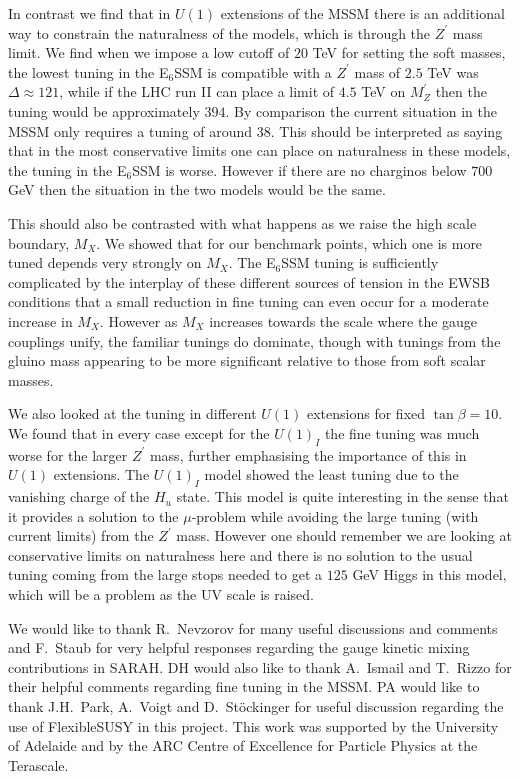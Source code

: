 \documentclass[preprint,amsmath,amssymb,aps,superscriptaddress,prd,
showpacs,floatfix,nofootinbib]{revtex4-1}
\begin{document}
In contrast we find that in $U(1)$ extensions of the MSSM there is an
additional way to constrain the naturalness of the models, which is
through the $Z^\prime$ mass limit.  We find when we impose a low
cutoff of $20$ TeV for setting the soft masses, the lowest tuning in
the E$_6$SSM is compatible with a $Z^\prime$ mass of $2.5$ TeV was
$\Delta \approx 121$, while if the LHC run II can place a limit of
$4.5$ TeV on $M_Z^\prime$ then the tuning would be approximately $394$.
By comparison the current situation in the MSSM only requires a tuning
of around $38$.  This should be interpreted as saying that in
the most conservative limits one can place on naturalness in these
models, the tuning in the E$_6$SSM is worse.  However if there are no
charginos below $700$ GeV then the situation in the two models would
be the same.

This should also be contrasted with what happens as we raise the high
scale boundary, $M_X$.  We showed that for our benchmark points, which
one is more tuned depends very strongly on $M_X$.  The E$_6$SSM tuning
is sufficiently complicated by the interplay of these different
sources of tension in the EWSB conditions that a small reduction in
fine tuning can even occur for a moderate increase in $M_X$.  However
as $M_X$ increases towards the scale where the gauge couplings unify,
the familiar tunings do dominate, though with tunings from the gluino
mass appearing to be more significant relative to those from soft
scalar masses.

We also looked at the tuning in different $U(1)$ extensions for fixed
$\tan\beta = 10$.  We found that in every case except for the
$U(1)_I$ the fine tuning was much worse for the larger $Z^\prime$
mass, further emphasising the importance of this in $U(1)$ extensions.
The $U(1)_I$ model showed the least tuning due to
the vanishing charge of the $H_u$ state.  This model is quite
interesting in the sense that it provides a solution to the
$\mu$-problem while avoiding the large tuning (with current limits)
from the $Z^\prime$ mass.  However one should remember we are looking
at conservative limits on naturalness here and there is no solution to
the usual tuning coming from the large stops needed to get a $125$ GeV
Higgs in this model, which will be a problem as the UV scale is raised.

\begin{acknowledgments}
We would like to thank R.~Nevzorov for many useful
discussions and comments and F.~Staub for very helpful responses
regarding the gauge kinetic mixing contributions in SARAH.  DH would
also like to thank A.~Ismail and T.~Rizzo for their helpful comments
regarding fine tuning in the MSSM.  PA would like to thank J.H.~Park,
A.~Voigt and D.~St\"{o}ckinger for useful discussion regarding the use of
FlexibleSUSY in this project.  This work was supported by the University
of Adelaide and by the ARC Centre of Excellence for Particle Physics at
the Terascale.
\end{acknowledgments}
\end{document}

